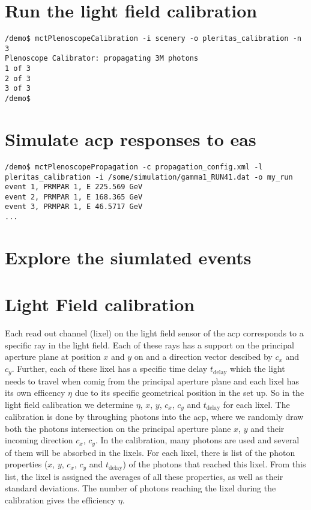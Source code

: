 \section{Run the light field calibration}
%
\begin{lstlisting}[style=MctBash]
/demo$ mctPlenoscopeCalibration -i scenery -o pleritas_calibration -n 3
Plenoscope Calibrator: propagating 3M photons
1 of 3
2 of 3
3 of 3
/demo$ 
\end{lstlisting}
%
%
\section{Simulate \ac{acp} responses to \ac{eas}}
%
\begin{lstlisting}[style=MctBash]
/demo$ mctPlenoscopePropagation -c propagation_config.xml -l pleritas_calibration -i /some/simulation/gamma1_RUN41.dat -o my_run
event 1, PRMPAR 1, E 225.569 GeV
event 2, PRMPAR 1, E 168.365 GeV
event 3, PRMPAR 1, E 46.5717 GeV
...
\end{lstlisting}
\section{Explore the siumlated events}

\section{Light Field calibration}
%
Each read out channel (lixel) on the light field sensor of the \ac{acp} corresponds to a specific ray in the light field. 
%
Each of these rays has a support on the principal aperture plane at position $x$ and $y$ on and a direction vector descibed by $c_x$ and $c_y$.
%
Further, each of these lixel has a specific time delay $t_\text{delay}$ which the light needs to travel when comig from the principal aperture plane and each lixel has its own efficency $\eta$ due to its specific geometrical position in the set up.
%
So in the light field calibration we determine $\eta$, $x$, $y$, $c_x$, $c_y$ and $t_\text{delay}$ for each lixel.
%
The calibration is done by throughing photons into the \ac{acp}, where we randomly draw both the photons intersection on the principal aperture plane $x$, $y$ and their incoming direction $c_x$, $c_y$.
%
In the calibration, many photons are used and several of them will be absorbed in the lixels.
%
For each lixel, there is list of the photon properties ($x$, $y$, $c_x$, $c_y$ and $t_\text{delay}$) of the photons that reached this lixel.
%
From this list, the lixel is assigned the averages of all these properties, as well as their standard deviations.
%
The number of photons reaching the lixel during the calibration gives the efficiency $\eta$.